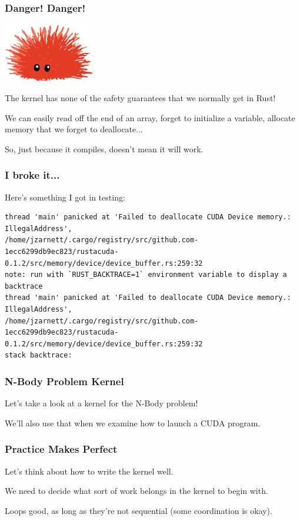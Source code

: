 \begin{frame}
\frametitle{Danger! Danger!}

\begin{center}
	\includegraphics[width=0.3\textwidth]{images/unsafe.png}
\end{center}

The kernel has none of the safety guarantees that we normally get in Rust! 

We can easily read off the end of an array, forget to initialize a variable, allocate memory that we forget to deallocate...

So, just because it compiles, doesn't mean it will work.

\end{frame}


\begin{frame}[fragile]
\frametitle{I broke it...}

Here's something I got in testing:
{\tiny
\begin{verbatim}
thread 'main' panicked at 'Failed to deallocate CUDA Device memory.: IllegalAddress', 
/home/jzarnett/.cargo/registry/src/github.com-1ecc6299db9ec823/rustacuda-0.1.2/src/memory/device/device_buffer.rs:259:32
note: run with `RUST_BACKTRACE=1` environment variable to display a backtrace
thread 'main' panicked at 'Failed to deallocate CUDA Device memory.: IllegalAddress', 
/home/jzarnett/.cargo/registry/src/github.com-1ecc6299db9ec823/rustacuda-0.1.2/src/memory/device/device_buffer.rs:259:32
stack backtrace:
\end{verbatim}
}

\end{frame}


\begin{frame}
\frametitle{N-Body Problem Kernel}

Let's take a look at a kernel for the N-Body problem!

We'll also use that when we examine how to launch a CUDA program.

\end{frame}


\begin{frame}
\frametitle{Practice Makes Perfect}
Let's think about how to write the kernel well.

We need to decide what sort of work belongs in the kernel to begin with.

Loops good, as long as they're not sequential (some coordination is okay).

\end{frame}


